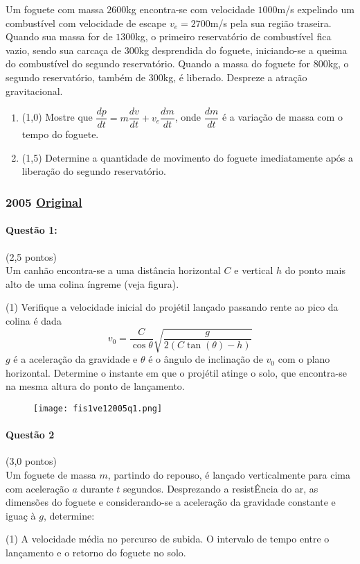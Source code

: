 \documentclass[12pt,a4paper]{article}
\newcommand{\original}[1]{\tiny \href{#1}{Original} \normalsize}
\begin{document}
Um foguete com massa $2600$kg encontra-se com velocidade $1000$m/s expelindo um combustível com velocidade de escape $v_e=2700$m/s
pela sua região traseira. Quando sua massa for de $1300$kg, o primeiro reservatório de combustível fica vazio, sendo sua carcaça de $300$kg
desprendida do foguete, iniciando-se a queima do combustível do segundo reservatório. Quando a massa do foguete for $800$kg,
o segundo reservatório, também de $300$kg, é liberado. Despreze a atração gravitacional.

\begin{enumerate}[label=\alph*)]
\item (1,0) Mostre que $\dfrac{dp}{dt}=m\dfrac{dv}{dt} + v_e \dfrac{dm}{dt}$, onde $\dfrac{dm}{dt}$ é a variação de massa com o tempo do foguete.
\item (1,5) Determine a quantidade de movimento do foguete imediatamente após a liberação do segundo reservatório.
\end{enumerate}

\newpage

\subsubsection{2005 \original{https://drive.google.com/open?id=1pbDtSfy9FXzZvWNOPgZVUWwKYQeuL7Z2}}

\paragraph{Questão 1:}(2,5 pontos)\\
Um canhão encontra-se a uma distância horizontal $C$ e vertical $h$ do ponto mais alto de uma colina íngreme (veja figura).

\begin{tasks}(1)
\task Verifique a velocidade inicial do projétil lançado passando rente ao pico da colina é dada
$$v_0=\dfrac{C}{\cos\theta}\sqrt{\dfrac{g}{2(C\tan(\theta)-h)}}$$
$g$ é a aceleração da gravidade e $\theta$ é o ângulo de inclinação de $v_0$ com o plano horizontal.
\task Determine o instante em que o projétil atinge o solo, que encontra-se na mesma altura do ponto de lançamento.
\end{tasks}

\begin{figure}[ht]
\centering
\texttt{[image: fis1ve12005q1.png]}
\end{figure}

\paragraph{Questão 2}(3,0 pontos)\\
Um foguete de massa $m$, partindo do repouso, é lançado verticalmente para cima com aceleração $a$ durante $t$ segundos. Desprezando a resistÊncia do ar, as dimensões do foguete e considerando-se a aceleração da gravidade constante e iguaç à $g$, determine:
\begin{tasks}(1)
\task A velocidade média no percurso de subida.
\task O intervalo de tempo entre o lançamento e o retorno do foguete no solo.
\end{tasks}
\end{document}
